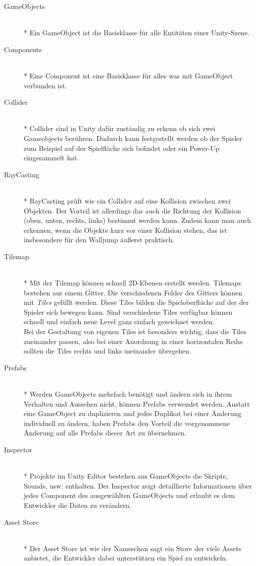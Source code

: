 \begin{description}
    \item[GameObjects] \hfill \\* Ein GameObject ist die Basisklasse für alle Entitäten einer Unity-Szene.
    \item[Components] \hfill \\* Eine Component ist eine Basisklasse für alles was mit GameObject verbunden ist.
    \item[Collider] \hfill \\* Collider sind in Unity dafür zuständig zu erkenn ob sich zwei Gameobjects berühren. Dadurch kann festgestellt werden ob der Spieler zum Beispiel auf der Spielfläche sich befindet oder ein Power-Up eingesammelt hat.
    \item[RayCasting] \hfill \\*
        RayCasting prüft wie ein Collider auf eine Kollision zwischen zwei Objekten. Der Vorteil ist allerdings das auch die Richtung der Kollision (oben, unten, rechts, links) bestimmt werden kann. Zudem kann man auch erkennen, wenn die Objekte kurz vor einer Kollision stehen, das ist insbesondere für den Walljump äußerst praktisch.
    \item[Tilemap] \hfill \\* Mit der Tilemap können schnell 2D-Ebenen erstellt werden. Tilemaps bestehen aus einem Gitter. Die verschiedenen Felder des Gitters können mit \textit{Tiles} gefüllt werden. Diese Tiles bilden die Spieloberfläche auf der der Spieler sich bewegen kann. Sind verschiedene Tiles verfügbar können schnell und einfach neue Level ganz einfach gezeichnet werden. \\ 
        Bei der Gestaltung von eigenen Tiles ist besonders wichtig, dass die Tiles zueinander passen, also bei einer Anordnung in einer horizontalen Reihe sollten die Tiles rechts und links ineinander übergehen.
        
        
    \item[Prefabs] \hfill \\* Werden GameObjects mehrfach benötigt und ändern sich in ihrem Verhalten und Aussehen nicht, können Prefabs verwendet werden. Anstatt eine GameObject zu duplizieren und jedes Duplikat bei einer Änderung individuell zu ändern, haben Prefabs den Vorteil die vorgenommene Änderung auf alle Prefabs dieser Art zu übernehmen.
    \item[Inspector] \hfill \\* Projekte im Unity Editor bestehen aus GameObjects die Skripte, Sounds, usw. enthalten. Der Inspector zeigt detaillierte Informationen über jedes Component des ausgewählten GameObjects und erlaubt es dem Entwickler die Daten zu verändern.
    \item[Asset Store] \hfill \\* Der Asset Store ist wie der Nameschon sagt ein Store der viele Assets anbietet, die Entwickler dabei unterstützen ein Spiel zu entwickeln.
\end{description}

